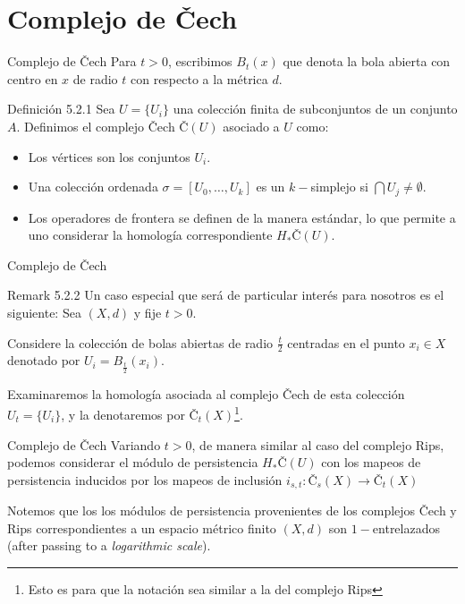 \documentclass{beamer}
\begin{document}
\section{Complejo de \v{C}ech}
\begin{frame}{Complejo de \v{C}ech}
    Para $t > 0$, escribimos $B_{t}(x)$ que denota  la bola abierta con centro en $x$ de radio $t$ con respecto a la métrica $d$.
    \newline
    \pause

    \begin{block}{Definición 5.2.1}
        Sea $U = \{U_{i}\}$ una colección finita de subconjuntos de un conjunto $A$. Definimos el complejo \v{C}ech \v{C}$(U)$ asociado a $U$ como:
        \begin{itemize}
            \item Los vértices son los conjuntos $U_i$.
            \item Una colección ordenada $\sigma = [U_{0}, \ldots, U_{k}]$  es un $k-$simplejo si $\bigcap U_{j} \neq \emptyset$.
            \item Los operadores de frontera se definen de la manera estándar, lo que permite a uno considerar la homología correspondiente $H_{*}$\v{C}$(U)$.
        \end{itemize}
    \end{block}
\end{frame}

\begin{frame}{Complejo de \v{C}ech}
    \begin{block}{Remark 5.2.2}
        Un caso especial que será de particular interés para nosotros es el siguiente: Sea $(X,d)$ y fije $t > 0$. 
        \newline
        \pause
        
        Considere la colección de bolas abiertas de radio $\frac{t}{2}$ centradas en el punto $x_{i} \in X$ denotado por $U_i = B_{\frac{t}{2}}(x_i)$. 
        \newline
        \pause
        
        Examinaremos la homología asociada al complejo \v{C}ech de esta colección $U_t = \{U_i\}$, y la denotaremos por \v{C}$_{t}(X)$\footnote{Esto es para que la notación sea similar a la del complejo Rips}.
    \end{block}
\end{frame}


\begin{frame}{Complejo de \v{C}ech}
    Variando $t>0$, de manera similar al caso del complejo Rips, podemos considerar el módulo de persistencia $H_{*}$\v{C}$(U)$ con los mapeos de persistencia inducidos por los mapeos de inclusión $i_{s,t}:$\v{C}$_{s}(X) \to $\v{C}$_{t}(X)$
    \newline
    \pause

    Notemos que los los módulos de persistencia provenientes de los complejos \v{C}ech y Rips correspondientes a un espacio métrico finito $(X, d)$ son $1-$entrelazados (after passing to a \textit{logarithmic scale}).
\end{frame}
\end{document}
